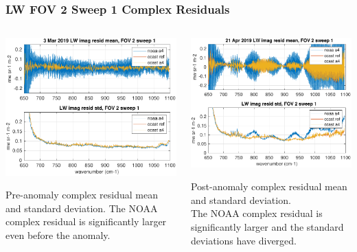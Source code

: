 \documentclass[10pt]{beamer}
\begin{document}
\begin{frame}
\frametitle{LW FOV 2 Sweep 1 Complex Residuals}
\begin{columns}[t]
\begin{column}{0.5\textwidth}
  \begin{centering}
  \includegraphics[width=\textwidth]{figures/LW_MW_good_imag_fov2_sd1.pdf}
  \end{centering}\vspace{3mm}
  Pre-anomaly complex residual mean and standard deviation.  The NOAA complex
  residual is significantly larger even before the anomaly.

\end{column}
\begin{column}{0.5\textwidth}  
  \begin{centering}
  \includegraphics[width=\textwidth]{figures/LW_MW_fail_imag_fov2_sd1.pdf}
  \end{centering}\vspace{3mm}
  Post-anomaly complex residual mean and standard deviation.  \\The
  NOAA complex residual is significantly larger and the standard
  deviations have diverged.


\end{column}
\end{columns}
\end{frame}
\end{document}
